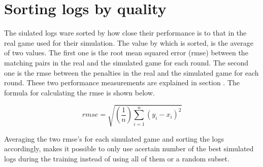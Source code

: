 

\section{Sorting logs by quality}
\label{sorting_logs_by_quality}
The siulated logs ware sorted by how close their performance is to that in the real game used for their simulation. The value by which is sorted, is the average of two values. The first one is the root mean squared error (rmse) between the matching pairs in the real and the simulated game for each round. The second one is the rmse between the penalties in the real and the simulated game for each round. These two performance measurements are explained in section . The formula for calculating the rmse is shown below. 

\begin{equation*}
rmse = \sqrt{(\frac{1}{n})\sum_{i=1}^{n}(y_{i} - x_{i})^{2}}
\end{equation*}

Averaging the two rmse's for each simulated game and sorting the logs accordingly,   makes it possible to only use acertain number of the best simulated logs during the training instead of using all of them or a random subset. 

